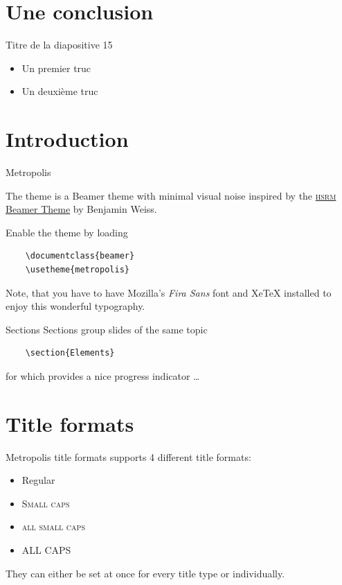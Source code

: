 \documentclass[10pt]{beamer}
\begin{document}
\section{Une conclusion}

\begin{frame}[fragile]{Titre de la diapositive 15}
      \begin{itemize}[<+- | alert@+>]
      \item Un premier truc
      \item Un deuxième truc
      \end{itemize}
\end{frame}

\section{Introduction}

\begin{frame}[fragile]{Metropolis}

  The \themename theme is a Beamer theme with minimal visual noise
  inspired by the \href{https://github.com/hsrmbeamertheme/hsrmbeamertheme}{\textsc{hsrm} Beamer
  Theme} by Benjamin Weiss.

  Enable the theme by loading

  \begin{verbatim}    \documentclass{beamer}
    \usetheme{metropolis}\end{verbatim}

  Note, that you have to have Mozilla's \emph{Fira Sans} font and XeTeX
  installed to enjoy this wonderful typography.
\end{frame}
\begin{frame}[fragile]{Sections}
  Sections group slides of the same topic

  \begin{verbatim}    \section{Elements}\end{verbatim}

  for which \themename provides a nice progress indicator \ldots
\end{frame}

\section{Title formats}

\begin{frame}{Metropolis title formats}
	\themename supports 4 different title formats:
	\begin{itemize}
		\item Regular
		\item \textsc{Small caps}
		\item \textsc{all small caps}
		\item ALL CAPS
	\end{itemize}
	They can either be set at once for every title type or individually.
\end{frame}
\end{document}
